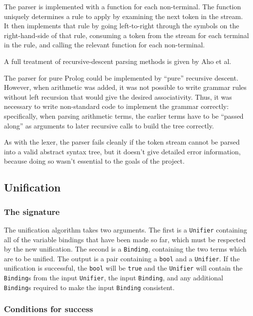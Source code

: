 \documentclass[12pt]{article}
\begin{document}
The parser is implemented with a function for each non-terminal. 
The function uniquely determines a rule to apply by examining the next token in the stream. 
It then implements that rule by going left-to-right through the symbols on the right-hand-side of that rule, consuming a token from the stream for each terminal in the rule, and calling the relevant function for each non-terminal.

A full treatment of recursive-descent parsing methods is given by Aho et al. \cite{compiler}

The parser for pure Prolog could be implemented by ``pure'' recursive descent. 
However, when arithmetic was added, it was not possible to write grammar rules without left recursion that would give the desired associativity. 
Thus, it was necessary to write non-standard code to implement the grammar correctly: specifically, when parsing arithmetic terms, the earlier terms have to be ``passed along'' as arguments to later recursive calls to build the tree correctly.

As with the lexer, the parser fails cleanly if the token stream cannot be parsed into a valid abstract syntax tree, but it doesn't give detailed error information, because doing so wasn't essential to the goals of the project.

\subsection{Unification}

\subsubsection{The signature}

The unification algorithm takes two arguments. 
The first is a \verb|Unifier| containing all of the variable bindings that have been made so far, which must be respected by the new unification. 
The second is a \verb|Binding|, containing the two terms which are to be unified. 
The output is a pair containing a \verb|bool| and a \verb|Unifier|. 
If the unification is successful, the \verb|bool| will be \verb|true| and the \verb|Unifier| will contain the \verb|Binding|s from the input \verb|Unifier|, the input \verb|Binding|, and any additional \verb|Binding|s required to make the input \verb|Binding| consistent.

\subsubsection{Conditions for success}
\end{document}
